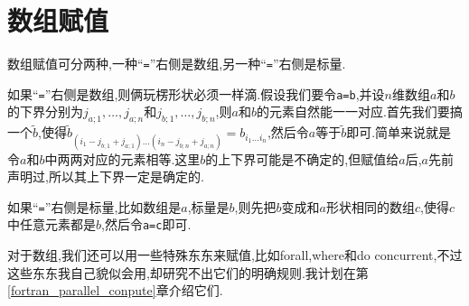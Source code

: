 \section{数组赋值}\label{fortran_array_assignment}

数组赋值可分两种,一种``\texttt{=}''右侧是数组,另一种``\texttt{=}''右侧是标量.

如果``\texttt{=}''右侧是数组,则俩玩楞形状必须一样滴.假设我们要令\texttt{a=b},并设$n$维数组$a$和$b$的下界分别为$j_{a;1},\dots,j_{a;n}$和$j_{b;1},\dots,j_{b;n}$,则$a$和$b$的元素自然能一一对应.首先我们要搞一个$\tilde{b}$,使得$\tilde{b}_{(i_1-j_{b;1}+j_{a;1})\dots(i_n-j_{b;n}+j_{a;n})}=b_{i_1\dots i_n}$,然后令$a$等于$\tilde{b}$即可.简单来说就是令$a$和$b$中两两对应的元素相等.这里$b$的上下界可能是不确定的,但赋值给$a$后,$a$先前声明过,所以其上下界一定是确定的.

如果``\texttt{=}''右侧是标量,比如数组是$a$,标量是$b$,则先把$b$变成和$a$形状相同的数组$c$,使得$c$中任意元素都是$b$,然后令\texttt{a=c}即可.

对于数组,我们还可以用一些特殊东东来赋值,比如forall,where和do concurrent,不过这些东东我自己貌似会用,却研究不出它们的明确规则.我计划在第\ref{fortran_parallel_conpute}章介绍它们.
